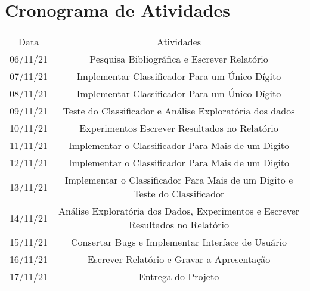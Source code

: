 \documentclass[conference]{IEEEtran}
\begin{document}
\section*{Cronograma de Atividades}
\begin{table}[!ht]
	\centering
    \begin{small}
        \begin{tabular}{cc}
        	\\
        	\\
            \hline
            Data                    & Atividades\\
            \hline
           
            06/11/21                & Pesquisa Bibliográfica e Escrever Relatório\\
            07/11/21                & Implementar Classificador Para um Único Dígito \\
            08/11/21                & Implementar Classificador Para um Único Dígito\\
            09/11/21                & Teste do Classificador e Análise Exploratória dos dados\\
            10/11/21                & Experimentos Escrever Resultados no Relatório\\
            11/11/21                & Implementar o Classificador Para Mais de um Digito\\
            12/11/21                & Implementar o Classificador Para Mais de um Digito\\
            13/11/21                & Implementar o Classificador Para Mais de um Digito e Teste do Classificador\\
            14/11/21                & Análise Exploratória dos Dados, Experimentos  e Escrever Resultados no Relatório \\
            15/11/21                & Consertar Bugs e Implementar Interface de Usuário\\
            16/11/21                & Escrever Relatório e Gravar a Apresentação\\
            17/11/21                & Entrega do Projeto\\
            
            \hline
        \end{tabular}
    \end{small}
\end{table}






\nocite{*}

\end{document}
